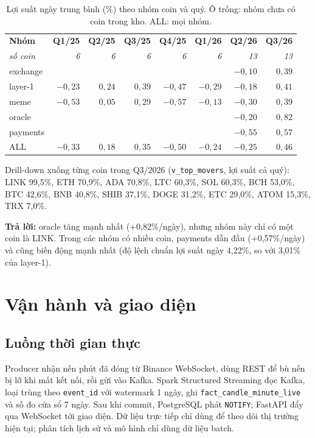 \documentclass[11pt,a4paper]{article}
\newcommand{\code}[1]{\texttt{#1}}
\begin{document}
\begin{table}[H]
\centering\small
\begin{tabular}{lrrrrrrr}
\toprule
\textbf{Nhóm} & \textbf{Q1/25} & \textbf{Q2/25} & \textbf{Q3/25} & \textbf{Q4/25} & \textbf{Q1/26} & \textbf{Q2/26} & \textbf{Q3/26} \\
\textit{số coin} & \textit{6} & \textit{6} & \textit{6} & \textit{6} & \textit{6} & \textit{13} & \textit{13} \\
\midrule
exchange & & & & & & $-0{,}10$ & $0{,}39$ \\
layer-1 & $-0{,}23$ & $0{,}24$ & $0{,}39$ & $-0{,}47$ & $-0{,}29$ & $-0{,}18$ & $0{,}41$ \\
meme & $-0{,}53$ & $0{,}05$ & $0{,}29$ & $-0{,}57$ & $-0{,}13$ & $-0{,}30$ & $0{,}39$ \\
oracle & & & & & & $-0{,}20$ & $0{,}82$ \\
payments & & & & & & $-0{,}55$ & $0{,}57$ \\
\midrule
ALL & $-0{,}33$ & $0{,}18$ & $0{,}35$ & $-0{,}50$ & $-0{,}24$ & $-0{,}25$ & $0{,}46$ \\
\bottomrule
\end{tabular}
\caption{Lợi suất ngày trung bình (\%) theo nhóm coin và quý. Ô trống: nhóm chưa có coin trong kho. ALL: mọi nhóm.}\label{tab:cat}
\end{table}

Drill-down xuống từng coin trong Q3/2026 (\code{v\_top\_movers}, lợi suất cả quý): LINK 99,5\%,
ETH 70,9\%, ADA 70,8\%, LTC 60,3\%, SOL 60,3\%, BCH 53,0\%, BTC 42,6\%, BNB 40,8\%, SHIB 37,1\%,
DOGE 31,2\%, ETC 29,0\%, ATOM 15,3\%, TRX 7,0\%.

\textbf{Trả lời:} oracle tăng mạnh nhất (+0,82\%/ngày), nhưng nhóm này chỉ có một coin là LINK.
Trong các nhóm có nhiều coin, payments dẫn đầu (+0,57\%/ngày) và cũng biến động mạnh nhất
(độ lệch chuẩn lợi suất ngày 4,22\%, so với 3,01\% của layer-1).


\section{Vận hành và giao diện}\label{sec:ops}

\subsection{Luồng thời gian thực}
Producer nhận nến phút đã đóng từ Binance WebSocket, dùng REST để bù nến bị lỡ khi mất kết nối,
rồi gửi vào Kafka. Spark Structured Streaming đọc Kafka, loại trùng theo \code{event\_id} với
watermark 1 ngày, ghi \code{fact\_candle\_minute\_live} và số đo cửa sổ 7 ngày. Sau khi commit,
PostgreSQL phát \code{NOTIFY}; FastAPI đẩy qua WebSocket tới giao diện. Dữ liệu trực tiếp chỉ
dùng để theo dõi thị trường hiện tại; phân tích lịch sử và mô hình chỉ dùng dữ liệu batch.
\end{document}
